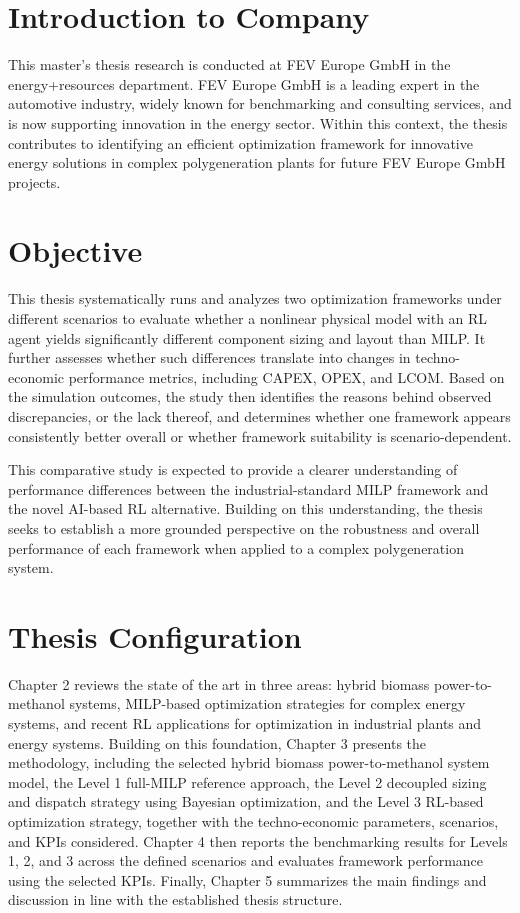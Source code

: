 \section{Introduction to Company}

This master's thesis research is conducted at FEV Europe GmbH in the energy+resources department. FEV Europe GmbH is a leading expert in the automotive industry, widely known for benchmarking and consulting services, and is now supporting innovation in the energy sector. Within this context, the thesis contributes to identifying an efficient optimization framework for innovative energy solutions in complex polygeneration plants for future FEV Europe GmbH projects.

\section{Objective}

This thesis systematically runs and analyzes two optimization frameworks under different scenarios to evaluate whether a nonlinear physical model with an RL agent yields significantly different component sizing and layout than MILP. It further assesses whether such differences translate into changes in techno-economic performance metrics, including CAPEX, OPEX, and LCOM. Based on the simulation outcomes, the study then identifies the reasons behind observed discrepancies, or the lack thereof, and determines whether one framework appears consistently better overall or whether framework suitability is scenario-dependent.

This comparative study is expected to provide a clearer understanding of performance differences between the industrial-standard MILP framework and the novel AI-based RL alternative. Building on this understanding, the thesis seeks to establish a more grounded perspective on the robustness and overall performance of each framework when applied to a complex polygeneration system.

\section{Thesis Configuration}

Chapter 2 reviews the state of the art in three areas: hybrid biomass power-to-methanol systems, MILP-based optimization strategies for complex energy systems, and recent RL applications for optimization in industrial plants and energy systems. Building on this foundation, Chapter 3 presents the methodology, including the selected hybrid biomass power-to-methanol system model, the Level 1 full-MILP reference approach, the Level 2 decoupled sizing and dispatch strategy using Bayesian optimization, and the Level 3 RL-based optimization strategy, together with the techno-economic parameters, scenarios, and KPIs considered. Chapter 4 then reports the benchmarking results for Levels 1, 2, and 3 across the defined scenarios and evaluates framework performance using the selected KPIs. Finally, Chapter 5 summarizes the main findings and discussion in line with the established thesis structure.
